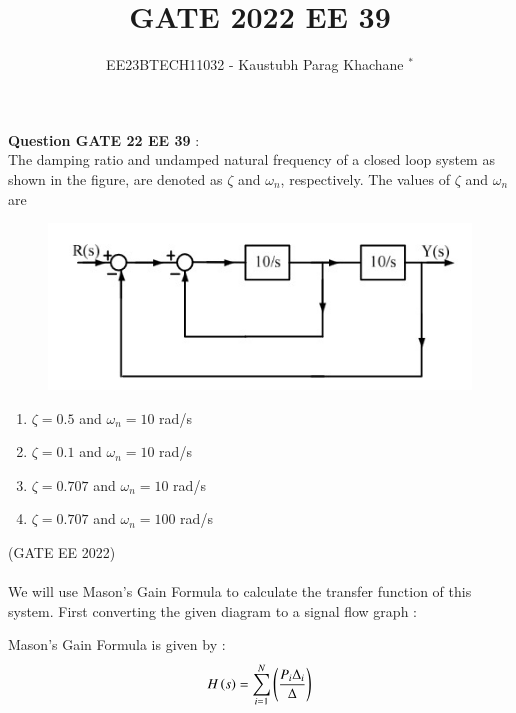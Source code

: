 \documentclass[journal,12pt,twocolumn]{IEEEtran}
\theoremstyle{remark}
\begin{document}

\vspace{3cm}

\Large\title{GATE 2022 EE 39}
\large\author{EE23BTECH11032 - Kaustubh Parag Khachane $^{*}$%
}
\maketitle
\newpage
\bigskip

\renewcommand{\thefigure}{\theenumi}
\renewcommand{\thetable}{\theenumi}
\large\textbf{Question GATE 22 EE 39} :\\
The damping ratio and undamped natural frequency of a closed loop system as
shown in the figure, are denoted as $\zeta$ and $\omega_n$, respectively. The values of $\zeta$ and $\omega_n$
are 
\begin{figure}[!ht]
\centering
\begin{center}
\includegraphics[width=\columnwidth]{question}
\end{center}
\end{figure}
\begin{enumerate}
    \item $\zeta = 0.5$ and $\omega_n = 10$ rad/s
    \item $\zeta = 0.1$ and $\omega_n = 10$ rad/s
    \item $\zeta = 0.707$ and $\omega_n = 10$ rad/s
    \item $\zeta = 0.707$ and $\omega_n = 100$ rad/s
\end{enumerate}
\hfill(GATE EE 2022)\\
\solution\\

We will use Mason's Gain Formula to calculate the transfer function of this system. First converting the given diagram to a signal flow graph :

Mason's Gain Formula is given by :
\begin{align}
    H\left(s\right) = \sum_{i=1}^{N}\left(\frac{P_i \Delta_i}{\Delta}\right) \label{eq:eq1_ee39}
\end{align}
\end{document}
